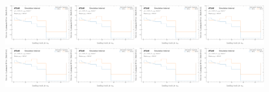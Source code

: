 \begin{figure}[h!]
\includegraphics[width=0.25\textwidth,page=9]{figures/SimResults/MultiFold_QCD_SystEffect.pdf}\includegraphics[width=0.25\textwidth,page=10]{figures/SimResults/MultiFold_QCD_SystEffect.pdf}\includegraphics[width=0.25\textwidth,page=11]{figures/SimResults/MultiFold_QCD_SystEffect.pdf}\includegraphics[width=0.25\textwidth,page=12]{figures/SimResults/MultiFold_QCD_SystEffect.pdf}\\
\includegraphics[width=0.25\textwidth,page=13]{figures/SimResults/MultiFold_QCD_SystEffect.pdf}\includegraphics[width=0.25\textwidth,page=14]{figures/SimResults/MultiFold_QCD_SystEffect.pdf}\includegraphics[width=0.25\textwidth,page=15]{figures/SimResults/MultiFold_QCD_SystEffect.pdf}\includegraphics[width=0.25\textwidth,page=16]{figures/SimResults/MultiFold_QCD_SystEffect.pdf}\\

\end{figure}
